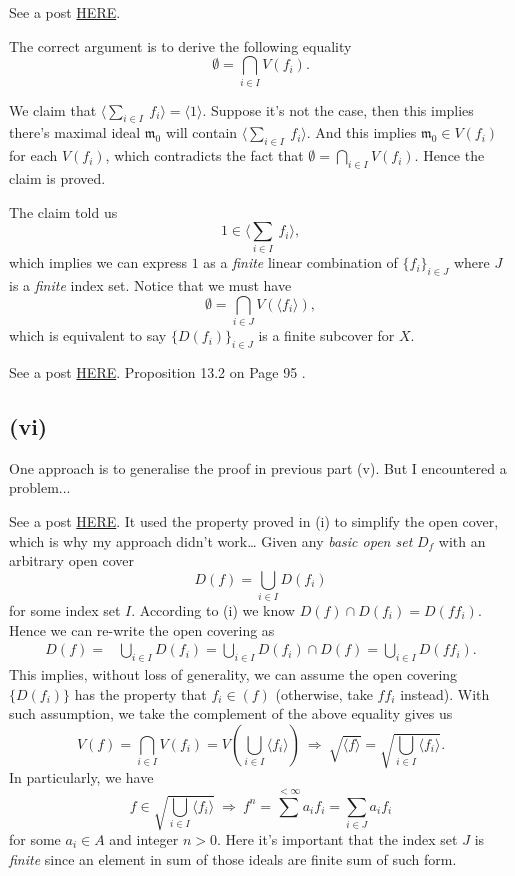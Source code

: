 See a post \href{https://math.stackexchange.com/questions/104248/compactness-of-operatornamespeca}{HERE}. 

The correct argument is to derive the following equality
$$\emptyset = \bigcap_{i\in I} V(f_i).$$

We claim that $\langle \sum_{i\in I}~ f_i\rangle= \langle 1\rangle$. Suppose it's not the case, then this implies there's maximal ideal $\mathfrak m_0$ will contain $\langle \sum_{i\in I}~ f_i\rangle$. And this implies $\mathfrak m_0\in V(f_i)$ for each $V(f_i)$, which contradicts the fact that $\emptyset = \bigcap_{i\in I} V(f_i)$. Hence the claim is proved. 

The claim told us $$1\in \langle \sum_{i\in I}~ f_i\rangle,$$ which implies we can express $1$ as a \textit{finite} linear combination of $\{f_i\}_{i\in J}$ where $J$ is a \textit{finite} index set. Notice that we must have $$\emptyset=\bigcap_{i\in J}V(\langle f_i\rangle),$$ which is equivalent to say $\{D(f_i)\}_{i\in J}$ is a finite subcover for $X$.

See a post \href{https://math.stackexchange.com/questions/2319058/proof-verification-zariski-topology-is-quasi-compact}{HERE}. Proposition 13.2 on Page 95 \cite{altman}. 

\subsection{(vi)}
One approach is to generalise the proof in previous part (v). But I encountered a problem...

See a post \href{https://math.stackexchange.com/questions/1175478/basic-open-sets-in-the-zariski-topology-are-also-compact}{HERE}. 
It used the property proved in (i) to simplify the open cover, which is why my approach didn't work\dots 
Given any \textit{basic open set} $D_f$ with an arbitrary open cover 
$$D(f)=\bigcup_{i\in I} D(f_i)$$ for some index set $I$. According to (i) we know $D(f)\cap D(f_i)=D(ff_i)$. Hence we can re-write the open covering as \begin{align*}
    D(f) =& \bigcup_{i\in I} D(f_i)
        = \bigcup_{i\in I} D(f_i)\cap D(f)
        = \bigcup_{i\in I} D(ff_i).
\end{align*}
This implies, without loss of generality, we can assume the open covering $\{D(f_i)\}$ has the property that $f_i\in (f)$ (otherwise, take $ff_i$ instead). With such assumption, we take the complement of the above equality gives us 
$$V(f)=\bigcap_{i\in I} V(f_i)=V(\bigcup_{i\in I}\langle f_i\rangle) ~\Rightarrow~ \sqrt{\langle f\rangle}=\sqrt{\bigcup_{i\in I}\langle f_i\rangle}.$$
In particularly, we have $$f\in \sqrt{\bigcup_{i\in I}\langle f_i\rangle} ~\Rightarrow~ f^n=\sum^{<\infty} a_if_i=\sum_{i\in J}a_if_i$$ for some $a_i\in A$ and integer $n>0$. Here it's important that the index set $J$ is \textit{finite} since an element in sum of those ideals are finite sum of such form. 

